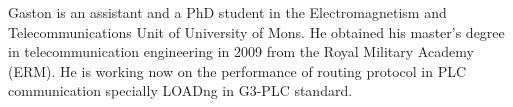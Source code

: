 Gaston is an assistant and a PhD student in the
Electromagnetism and Telecommunications Unit of University
of Mons. He obtained his master’s degree in
telecommunication engineering in 2009 from the Royal
Military Academy (ERM). He is working now on the performance
of routing protocol in PLC communication specially LOADng in
G3-PLC standard.
